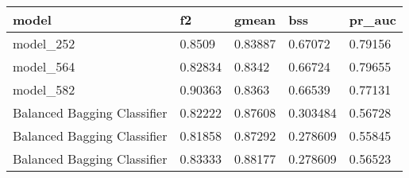 \begin{tabular}{|l|l|l|l|l|}
\hline
\textbf{model}              & \textbf{f2} & \textbf{gmean} & \textbf{bss} & \textbf{pr\_auc} \\ \hline
model\_252                  & 0.8509      & 0.83887        & 0.67072      & 0.79156          \\ \hline
model\_564                  & 0.82834     & 0.8342         & 0.66724      & 0.79655          \\ \hline
model\_582                  & 0.90363     & 0.8363         & 0.66539      & 0.77131          \\ \hline
Balanced Bagging Classifier & 0.82222     & 0.87608        & 0.303484     & 0.56728          \\ \hline
Balanced Bagging Classifier & 0.81858     & 0.87292        & 0.278609     & 0.55845          \\ \hline
Balanced Bagging Classifier & 0.83333     & 0.88177        & 0.278609     & 0.56523          \\ \hline
\end{tabular}
